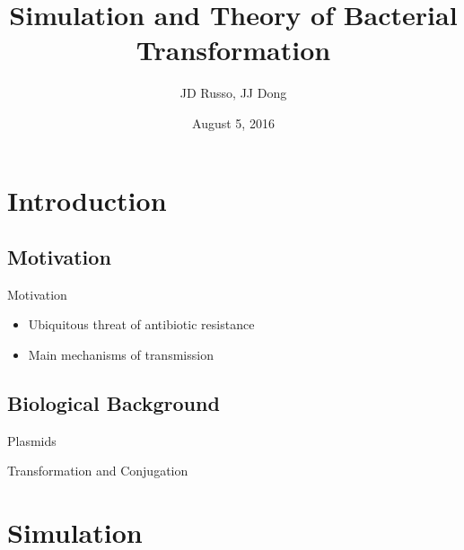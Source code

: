 \documentclass[12pt]{beamer}              %
\title{Simulation and Theory of Bacterial Transformation}
\date{August 5, 2016}
\author{JD Russo, JJ Dong}
\institute{Department of Physics and Astronomy, Bucknell University}
\begin{document}
\maketitle

\section{Introduction}

\subsection{Motivation}
\begin{frame}{Motivation}
  \begin{itemize}
    \item Ubiquitous threat of antibiotic resistance
    \item Main mechanisms of transmission
  \end{itemize}
\end{frame}



\subsection{Biological Background}
\begin{frame}[fragile]{Plasmids}
\end{frame}

\begin{frame}{Transformation and Conjugation}
\end{frame}




\section{Simulation}
\end{document}
